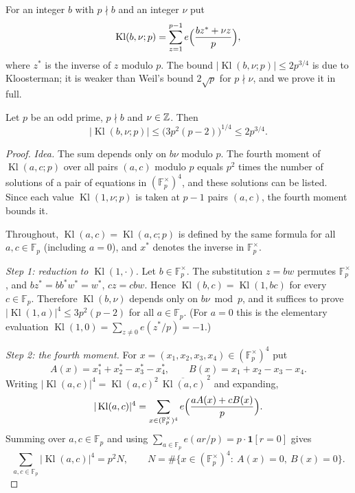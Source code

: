 For an integer $b$ with $p\nmid b$ and an integer $\nu$ put
\[
\operatorname{Kl}(b,\nu;p)=\sum_{z=1}^{p-1}e\Bigl(\frac{bz^*+\nu z}{p}\Bigr),
\]
where $z^*$ is the inverse of $z$ modulo $p$. The bound $|\operatorname{Kl}(b,\nu;p)|\le2p^{3/4}$ is due to Kloosterman; it is weaker than Weil's bound $2\sqrt p$ for $p\nmid\nu$, and we prove it in full.

\begin{lemma}\label{lem:kloosterman}
Let $p$ be an odd prime, $p\nmid b$ and $\nu\in\mathbb{Z}$. Then
\[
|\operatorname{Kl}(b,\nu;p)|\le\bigl(3p^2(p-2)\bigr)^{1/4}\le2p^{3/4}.
\]
\end{lemma}

\begin{proof}
\emph{Idea.} The sum depends only on $b\nu$ modulo $p$. The fourth moment of $\operatorname{Kl}(a,c;p)$ over all pairs $(a,c)$ modulo $p$ equals $p^2$ times the number of solutions of a pair of equations in $(\mathbb F_p^\times)^4$, and these solutions can be listed. Since each value $\operatorname{Kl}(1,\nu;p)$ is taken at $p-1$ pairs $(a,c)$, the fourth moment bounds it.

Throughout, $\operatorname{Kl}(a,c)=\operatorname{Kl}(a,c;p)$ is defined by the same formula for all $a,c\in\mathbb F_p$ (including $a=0$), and $x^*$ denotes the inverse in $\mathbb F_p^\times$.

\emph{Step 1: reduction to $\operatorname{Kl}(1,\cdot)$.} Let $b\in\mathbb F_p^\times$. The substitution $z=bw$ permutes $\mathbb F_p^\times$, and $bz^*=bb^*w^*=w^*$, $cz=cbw$. Hence $\operatorname{Kl}(b,c)=\operatorname{Kl}(1,bc)$ for every $c\in\mathbb F_p$. Therefore $\operatorname{Kl}(b,\nu)$ depends only on $b\nu\bmod p$, and it suffices to prove $|\operatorname{Kl}(1,a)|^4\le3p^2(p-2)$ for all $a\in\mathbb F_p$. (For $a=0$ this is the elementary evaluation $\operatorname{Kl}(1,0)=\sum_{z\ne0}e(z^*/p)=-1$.)

\emph{Step 2: the fourth moment.} For $x=(x_1,x_2,x_3,x_4)\in(\mathbb F_p^\times)^4$ put
\[
A(x)=x_1^*+x_2^*-x_3^*-x_4^*,\qquad B(x)=x_1+x_2-x_3-x_4.
\]
Writing $|\operatorname{Kl}(a,c)|^4=\operatorname{Kl}(a,c)^2\,\overline{\operatorname{Kl}(a,c)}^{\,2}$ and expanding,
\[
|\operatorname{Kl}(a,c)|^4=\sum_{x\in(\mathbb F_p^\times)^4}e\Bigl(\frac{aA(x)+cB(x)}p\Bigr).
\]
Summing over $a,c\in\mathbb F_p$ and using $\sum_{a\in\mathbb F_p}e(ar/p)=p\cdot\mathbf 1[r=0]$ gives
\[
\sum_{a,c\in\mathbb F_p}|\operatorname{Kl}(a,c)|^4=p^2N,\qquad N=\#\{x\in(\mathbb F_p^\times)^4:\ A(x)=0,\ B(x)=0\}.
\]


\end{proof}
